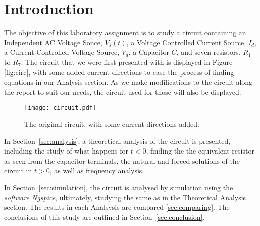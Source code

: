 \newpage
\section{Introduction}
\label{sec:introduction}

The objective of this laboratory assignment is to study a circuit containing an Independent AC Voltage Souce, $V_s(t)$, a Voltage Controlled Current Source, $I_d$, a Current Controlled Voltage Source, $V_d$, a Capacitor $C$, and seven resistors, $R_1$ to $R_7$. The circuit that we were first presented with is displayed in Figure \ref{fig:circ}, with some added current directions to ease the process of finding equations in our Analysis section. As we make modifications to the circuit along the report to suit our needs, the circuit used for those will also be displayed.

\begin{figure}[h] \centering
\texttt{[image: circuit.pdf]}
\caption{The original circuit, with some current directions added.}
\label{fig1}
\end{figure}

In Section~\ref{sec:analysis}, a theoretical analysis of the circuit is
presented, including the study of what happens for $t<0$, finding the the equivalent resistor as seen from the capacitor
terminals, the natural and forced solutions of the circuit in $t>0$, as well as frequency analysis.

In Section~\ref{sec:simulation}, the circuit is analysed by
simulation using the \textit{software Ngspice}, ultimately, studying the same as in the Theoretical Analysis section.
The results in each Analsysis are compared \ref{sec:comparing}.
The conclusions of this study are outlined in
Section~\ref{sec:conclusion}.
